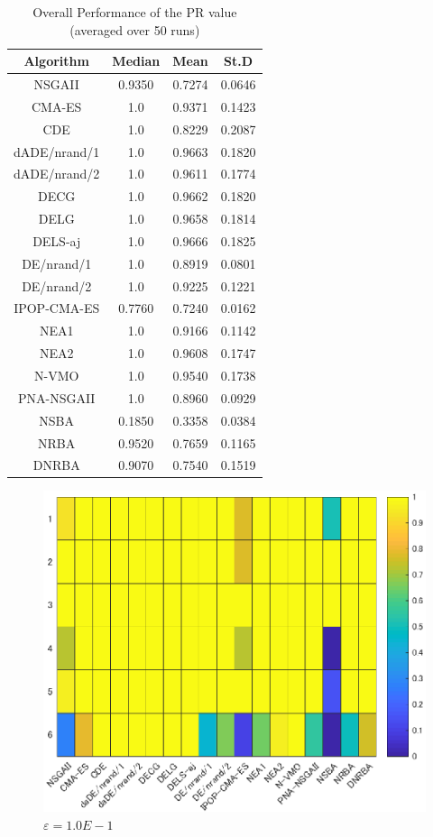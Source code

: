 \documentclass[a4j,11pt]{jarticle}
\begin{document}
\begin{table}[b]
\caption{Overall Performance of the PR value (averaged over 50 runs)}
\begin{center}
\begin{tabular}{c|c|c|c}
\hline

Algorithm & Median & Mean & St.D  \\

\hline
NSGAII & 0.9350 & 0.7274 & 0.0646 \\
\hline
CMA-ES & 1.0 & 0.9371 & 0.1423 \\
\hline
CDE & 1.0 & 0.8229 & 0.2087 \\
\hline
dADE/nrand/1 & 1.0 & 0.9663 & 0.1820 \\
\hline
dADE/nrand/2 & 1.0 & 0.9611 & 0.1774 \\
\hline
DECG & 1.0 & 0.9662 & 0.1820 \\
\hline
DELG & 1.0 & 0.9658 & 0.1814 \\
\hline
DELS-aj & 1.0 & 0.9666 & 0.1825 \\
\hline
DE/nrand/1 & 1.0 & 0.8919 & 0.0801 \\
\hline
DE/nrand/2 & 1.0 & 0.9225 & 0.1221 \\
\hline
IPOP-CMA-ES & 0.7760 & 0.7240 & 0.0162 \\
\hline
NEA1 & 1.0 & 0.9166 & 0.1142 \\
\hline
NEA2 & 1.0 & 0.9608 & 0.1747 \\
\hline
N-VMO & 1.0 & 0.9540 & 0.1738 \\
\hline
PNA-NSGAII & 1.0 & 0.8960 & 0.0929 \\
\hline
NSBA & 0.1850 & 0.3358 & 0.0384 \\
\hline
NRBA & 0.9520 & 0.7659 & 0.1165 \\
\hline
DNRBA & 0.9070 & 0.7540 & 0.1519 \\
\hline

\end{tabular}
\label{tab:MOP_results}
\end{center}
\end{table}


\begin{figure}
\centering
\includegraphics[width=0.8\linewidth]{eps/E-1.eps}
\caption{$\varepsilon = 1.0E-1$}
\label{fig:resutls_comp_E1}
\end{figure}
\end{document}
